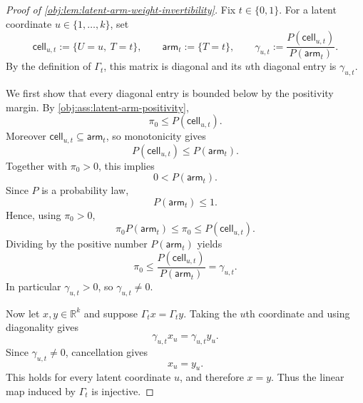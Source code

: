 \begin{proof}[Proof of \cref{obj:lem:latent-arm-weight-invertibility}]
Fix \(t\in\{0,1\}\). For a latent coordinate \(u\in\{1,\ldots,k\}\), set
\[
\mathsf{cell}_{u,t}:=\{U=u,\ T=t\},
\qquad
\mathsf{arm}_{t}:=\{T=t\},
\qquad
\gamma_{u,t}:=\frac{P(\mathsf{cell}_{u,t})}{P(\mathsf{arm}_t)} .
\]
By the definition of \(\Gamma_t\), this matrix is diagonal and its \(u\)th diagonal entry is \(\gamma_{u,t}\). %

We first show that every diagonal entry is bounded below by the positivity margin. By \cref{obj:ass:latent-arm-positivity},
\[
\pi_0\le P(\mathsf{cell}_{u,t}).
\]
Moreover \(\mathsf{cell}_{u,t}\subseteq \mathsf{arm}_t\), so monotonicity gives
\[
P(\mathsf{cell}_{u,t})\le P(\mathsf{arm}_t).
\]
Together with \(\pi_0>0\), this implies
\[
0<P(\mathsf{arm}_t).
\]
Since \(P\) is a probability law,
\[
P(\mathsf{arm}_t)\le 1.
\]
Hence, using \(\pi_0>0\),
\[
\pi_0 P(\mathsf{arm}_t)
\le \pi_0
\le P(\mathsf{cell}_{u,t}).
\]
Dividing by the positive number \(P(\mathsf{arm}_t)\) yields
\[
\pi_0
\le
\frac{P(\mathsf{cell}_{u,t})}{P(\mathsf{arm}_t)}
=
\gamma_{u,t}.
\]
In particular \(\gamma_{u,t}>0\), so \(\gamma_{u,t}\ne0\). %

Now let \(x,y\in\mathbb R^k\) and suppose \(\Gamma_t x=\Gamma_t y\). Taking the \(u\)th coordinate and using diagonality gives
\[
\gamma_{u,t}x_u=\gamma_{u,t}y_u .
\]
Since \(\gamma_{u,t}\ne0\), cancellation gives
\[
x_u=y_u .
\]
This holds for every latent coordinate \(u\), and therefore \(x=y\). Thus the linear map induced by \(\Gamma_t\) is injective. %
\end{proof}
